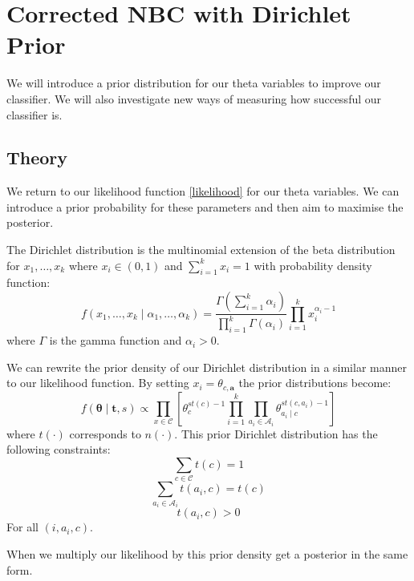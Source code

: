 \chapter{Corrected NBC with Dirichlet Prior}

We will introduce a prior distribution for our theta variables to improve our classifier. We will also investigate new ways of measuring how successful our classifier is.

\section{Theory}

We return to our likelihood function \cref{likelihood} for our theta variables. We can introduce a prior probability for these parameters and then aim to maximise the posterior.

The Dirichlet distribution is the multinomial extension of the beta distribution for $x_1,\dots,x_k$ where $x_i \in (0,1)$ and $\sum_{i=1}^k x_i = 1$ with probability density function:
\begin{equation} \label{dirichlet_pdf}
	f(x_1,\dots,x_k \mid \alpha_1,\dots,\alpha_k) = \frac{\Gamma(\sum_{i=1}^k\alpha_i)}{\prod_{i=1}^k\Gamma(\alpha_i)} \prod_{i=1}^k x_i^{\alpha_i - 1}
\end{equation}
where $\Gamma$ is the gamma function and $\alpha_i > 0$.

We can rewrite the prior density of our Dirichlet distribution in a similar manner to our likelihood function. By setting $x_i = \theta_{c,\mathbf{a}}$ the prior distributions become:
\begin{equation} \label{prior}
	f(\mathbf{\theta} \mid \mathbf{t}, s) \propto \prod_{x \in \mathcal{C}} \left[ \theta_c^{st(c) - 1} \prod_{i=1}^k \prod_{a_i \in \mathcal{A}_i} \theta_{a_i \mid c}^{st(c, a_i) - 1} \right]
\end{equation}
where $t(\cdot)$ corresponds to $n(\cdot)$. This prior Dirichlet distribution \cite{Zaffalon01} has the following constraints:
\begin{equation}
	\sum_{c \in \mathcal{C}} t(c) = 1
\end{equation}
\begin{equation}
	\sum_{a_i \in \mathcal{A}_i} t(a_i, c) = t(c)
\end{equation}
\begin{equation}
	t(a_i, c) > 0
\end{equation}
For all $(i, a_i, c)$.

When we multiply our likelihood by this prior density get a posterior in the same form.